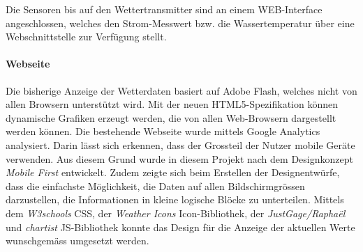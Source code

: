 \documentclass[10pt]{article}
\begin{document}
\begin{multicols}{2}

Die Sensoren bis auf den Wettertransmitter sind an einem WEB-Interface angeschlossen, welches den Strom-Messwert bzw. die Wassertemperatur über eine Webschnittstelle zur Verfügung stellt.
\paragraph{Webseite}
Die bisherige Anzeige der Wetterdaten basiert auf Adobe Flash, welches nicht von allen Browsern unterstützt wird. Mit der neuen HTML5-Spezifikation können dynamische Grafiken erzeugt werden, die von allen Web-Browsern dargestellt werden können. Die bestehende Webseite wurde mittels Google Analytics analysiert. Darin lässt sich erkennen, dass der Grossteil der Nutzer mobile Geräte verwenden. Aus diesem Grund wurde in diesem Projekt nach dem Designkonzept \textit{Mobile First} entwickelt. Zudem zeigte sich beim Erstellen der Designentwürfe, dass die einfachste Möglichkeit, die Daten auf allen Bildschirmgrössen darzustellen, die Informationen in kleine logische Blöcke zu unterteilen. Mittels dem \textit{W3schools} CSS, der \textit{Weather Icons} Icon-Bibliothek, der \textit{JustGage/Raphaël} und \textit{chartist} JS-Bibliothek konnte das Design für die Anzeige der aktuellen Werte wunschgemäss umgesetzt werden.

\end{multicols}
\end{document}
